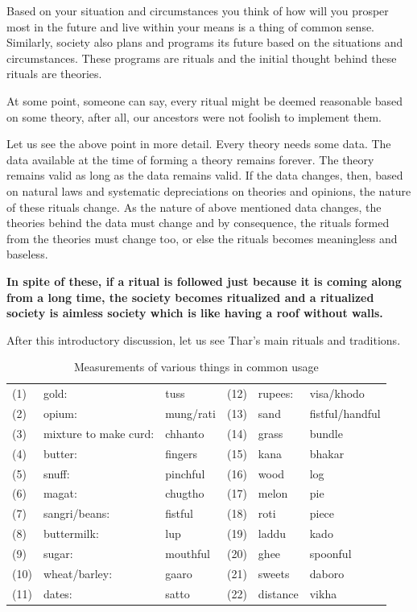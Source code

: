 Based on your situation and circumstances you think of how will you prosper most
in the future and live within your means is a thing of common sense. Similarly,
society also plans and programs its future based on the situations and
circumstances. These programs are rituals and the initial thought behind these
rituals are theories.

At some point, someone can say, every ritual might be deemed reasonable based
on some theory, after all, our ancestors were not foolish to implement them.

Let us see the above point in more detail. Every theory needs some data. The
data available at the time of forming a theory remains forever. The theory
remains valid as long as the data remains valid. If the data changes, then,
based on natural laws and systematic depreciations on theories and opinions, the
nature of these rituals change. As the nature of above mentioned data changes,
the theories behind the data must change and by consequence, the rituals formed
from the theories must change too, or else the rituals becomes meaningless and
baseless.

\textbf{In spite of these, if a ritual is followed just because it is coming
along from a long time, the society becomes ritualized and a ritualized society
is aimless society which is like having a roof without walls.}

After this introductory discussion, let us see Thar's main rituals and
traditions.

\begin{table}
\begin{center}
\begin{tabular}{|lll|lll|}
\hline
(1) & gold: & tuss & (12) & rupees: & visa/khodo\\
(2) & opium: & mung/rati & (13)  &sand  & fistful/handful\\
(3) &mixture to make curd: & chhanto & (14)  &grass  &bundle\\
(4) &butter: & fingers & (15) &kana  &bhakar\\
(5) &snuff: &pinchful & (16) &wood  &log\\
(6) &magat: &chugtho & (17) &melon  & pie\\
(7) &sangri/beans: &fistful & (18) &roti  & piece\\
(8) &buttermilk: &lup & (19) &laddu  &kado\\
(9) &sugar: &mouthful & (20) &ghee  & spoonful\\
(10)&wheat/barley: &gaaro & (21) &sweets  & daboro\\
(11)&dates: &satto & (22) &distance  & vikha\\
\hline
\end{tabular}
\end{center}
\caption{Measurements of various things in common usage}
\label{tbl:measure}
\end{table}

